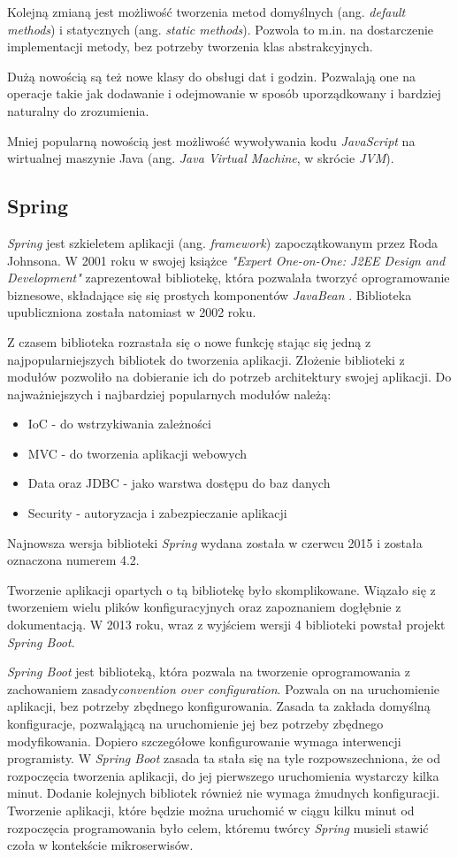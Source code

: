Kolejną zmianą jest możliwość tworzenia metod domyślnych (ang. \textsl{default methods}) i statycznych (ang. \textsl{static methods}). Pozwola to m.in. na dostarczenie implementacji metody, bez potrzeby tworzenia klas abstrakcyjnych.

Dużą nowością są też nowe klasy do obsługi dat i godzin. Pozwalają one na operacje takie jak dodawanie i odejmowanie w sposób uporządkowany i bardziej naturalny do zrozumienia.

Mniej popularną nowością jest możliwość wywoływania kodu \textsl{JavaScript} na wirtualnej maszynie Java (ang. \textsl{Java Virtual Machine}, w skrócie \textsl{JVM}).

\subsection{Spring}
\textsl{Spring} jest szkieletem aplikacji (ang. \textsl{framework}) zapoczątkowanym przez Roda Johnsona. W 2001 roku w swojej książce \textsl{"Expert One-on-One: J2EE Design and Development"} zaprezentował bibliotekę, która pozwalała tworzyć oprogramowanie biznesowe, składające się się prostych komponentów \textsl{JavaBean} \cite{jeedesign}. Biblioteka upubliczniona została natomiast w 2002 roku\cite{springinaction}.

Z czasem biblioteka rozrastała się o nowe funkcję stając się jedną z najpopularniejszych bibliotek do tworzenia aplikacji. Złożenie biblioteki z modułów pozwoliło na dobieranie ich do potrzeb architektury swojej aplikacji. Do najważniejszych i najbardziej popularnych modułów należą:
\begin{itemize}
\item IoC - do wstrzykiwania zależności
\item MVC - do tworzenia aplikacji webowych
\item Data oraz JDBC - jako warstwa dostępu do baz danych
\item Security - autoryzacja i zabezpieczanie aplikacji
\end{itemize}
Najnowsza wersja biblioteki \textsl{Spring} wydana została w czerwcu 2015 i została oznaczona numerem 4.2.

Tworzenie aplikacji opartych o tą bibliotekę było skomplikowane. Wiązało się z tworzeniem wielu plików konfiguracyjnych oraz zapoznaniem dogłębnie z dokumentacją. W 2013 roku, wraz z wyjściem wersji 4 biblioteki powstał projekt \textsl{Spring Boot}. 

\textsl{Spring Boot} jest biblioteką, która pozwala na tworzenie oprogramowania z zachowaniem zasady\textsl{convention over configuration}. Pozwala on na uruchomienie aplikacji, bez potrzeby zbędnego konfigurowania. Zasada ta zakłada domyślną konfiguracje, pozwaląjącą na uruchomienie jej bez potrzeby zbędnego modyfikowania. Dopiero szczegółowe konfigurowanie wymaga interwencji programisty. W \textsl{Spring Boot} zasada ta stała się na tyle rozpowszechniona, że od rozpoczęcia tworzenia aplikacji, do jej pierwszego uruchomienia wystarczy kilka minut. Dodanie kolejnych bibliotek również nie wymaga żmudnych konfiguracji. Tworzenie aplikacji, które będzie można uruchomić w ciągu kilku minut od rozpoczęcia programowania było celem, któremu twórcy \textsl{Spring} musieli stawić czoła w kontekście mikroserwisów. 

